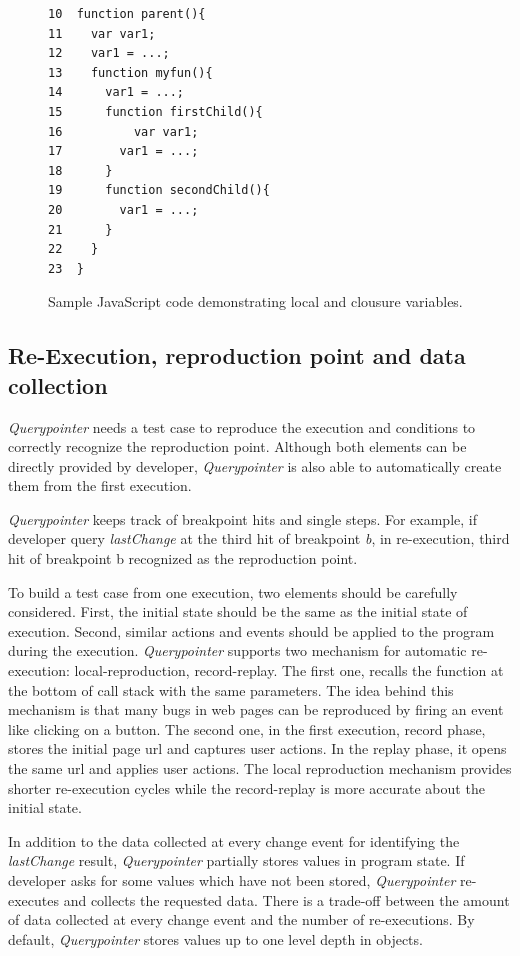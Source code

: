 \documentclass[preprint]{sigplanconf}
\begin{document}
\begin{figure}[htp]
\begin{verbatim}
10  function parent(){
11    var var1;
12    var1 = ...;
13    function myfun(){
14      var1 = ...;
15      function firstChild(){
16       	var var1;
17        var1 = ...;
18      }  
19      function secondChild(){
20        var1 = ...;			      
21      }
22    }  
23  }    
\end{verbatim}
\caption{Sample JavaScript code demonstrating local and clousure variables.}
\label{fig:js-closure}
\end{figure}

\subsection{Re-Execution, reproduction point and data collection}
\textit{Querypointer} needs a test case to reproduce the
execution and conditions to correctly recognize the reproduction point. 
Although both elements can be directly provided by developer, \textit{Querypointer}
is also able to automatically create them from the first execution. 

\textit{Querypointer} keeps track of breakpoint hits and single steps. For example, 
if developer query \textit{lastChange} at the third hit of breakpoint \textit{b}, in
re-execution, third hit of breakpoint b recognized as the reproduction point. 

To build a test case from one execution, two elements should be carefully 
considered. First, the initial state should be the same as the initial state
of execution. Second, similar actions and events should be applied to
the program during the execution. \textit{Querypointer} supports two mechanism
for automatic re-execution: local-reproduction, record-replay. The first one,
recalls the function at the bottom of call stack with the same parameters. The idea
behind this mechanism is that many bugs in web pages can be reproduced by firing
an event like clicking on a button. The second one, in the first execution, record phase, 
stores the initial page url and captures user actions. In the replay phase, it opens
the same url and applies user actions. The local reproduction mechanism provides
shorter re-execution cycles while the record-replay is more accurate about the
initial state.

In addition to the data collected at every change event for identifying the \textit{lastChange}
result, \textit{Querypointer} partially stores values in program state. If developer asks for 
some values which have not been stored, \textit{Querypointer} re-executes and collects the requested data.
There is a trade-off between the amount of data collected at every change event and the number of re-executions. 
By default, \textit{Querypointer} stores values up to one level depth in objects.
\end{document}

